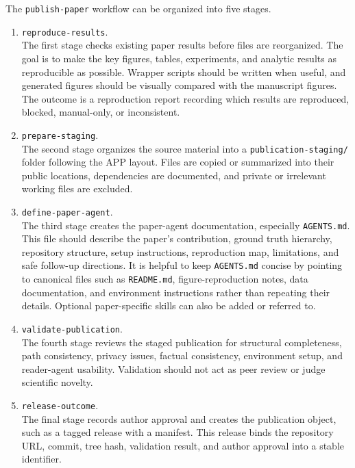\documentclass{article}
\begin{document}
The \texttt{publish-paper} workflow can be organized into five stages.

\begin{enumerate}
    \item \texttt{reproduce-results}.\\
          The first stage checks existing paper results before files are reorganized. The
          goal is to make the key figures, tables, experiments, and analytic results as
          reproducible as possible. Wrapper scripts should be written when useful, and
          generated figures should be visually compared with the manuscript figures. The
          outcome is a reproduction report recording which results are reproduced,
          blocked, manual-only, or inconsistent.

    \item \texttt{prepare-staging}.\\
          The second stage organizes the source material into a
          \texttt{publication-staging/} folder following the APP layout. Files are copied
          or summarized into their public locations, dependencies are documented, and
          private or irrelevant working files are excluded.

    \item \texttt{define-paper-agent}.\\
          The third stage creates the paper-agent documentation, especially
          \texttt{AGENTS.md}. This file should describe the paper's contribution, ground
          truth hierarchy, repository structure, setup instructions, reproduction map,
          limitations, and safe follow-up directions. It is helpful to keep \texttt{AGENTS.md} concise by pointing to canonical files such as \texttt{README.md}, figure-reproduction notes, data
          documentation, and environment instructions rather than repeating their
          details. Optional paper-specific skills can also be added or referred to.

    \item \texttt{validate-publication}.\\
          The fourth stage reviews the staged publication for structural completeness,
          path consistency, privacy issues, factual consistency, environment setup, and
          reader-agent usability. Validation should not act as peer review or judge
          scientific novelty. 

    \item \texttt{release-outcome}.\\
          The final stage records author approval and creates the publication object,
          such as a tagged release with a manifest. This release binds the repository
          URL, commit, tree hash, validation result, and author approval into a stable
          identifier.
\end{enumerate}
\end{document}
